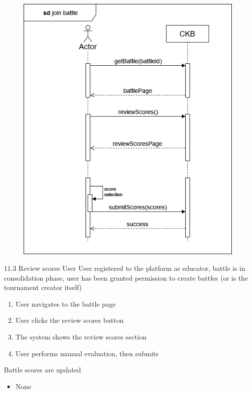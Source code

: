 \usecase
{
    \begin{figure}[H]
        \centering
        \includegraphics[width=\textwidth]{src/sd_diagrams/revscores.png}
    \end{figure}
}
{11.3}
{Review scores} %
{User} %
{User registered to the platform as educator, battle is in consolidation phase, user has been granted permission to create battles (or is the tournament creator itself)} %
{ %
    \begin{enumerate}
        \item User navigates to the battle page
        \item User clicks the review scores button
        \item The system shows the review scores section
        \item User performs manual evaluation, then submits
    \end{enumerate}
}
{Battle scores are updated} %
{ %
    \begin{itemize}
        \item None
    \end{itemize}
}
{ %

}

